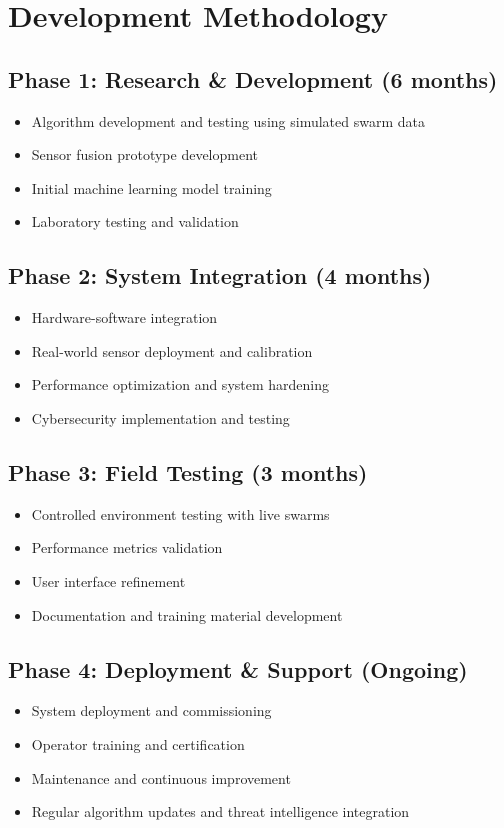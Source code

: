 \documentclass[11pt,a4paper]{article}
\begin{document}
\section{Development Methodology}

\subsection{Phase 1: Research \& Development (6 months)}
\begin{itemize}[leftmargin=2em]
    \item Algorithm development and testing using simulated swarm data
    \item Sensor fusion prototype development
    \item Initial machine learning model training
    \item Laboratory testing and validation
\end{itemize}

\subsection{Phase 2: System Integration (4 months)}
\begin{itemize}[leftmargin=2em]
    \item Hardware-software integration
    \item Real-world sensor deployment and calibration
    \item Performance optimization and system hardening
    \item Cybersecurity implementation and testing
\end{itemize}

\subsection{Phase 3: Field Testing (3 months)}
\begin{itemize}[leftmargin=2em]
    \item Controlled environment testing with live swarms
    \item Performance metrics validation
    \item User interface refinement
    \item Documentation and training material development
\end{itemize}

\subsection{Phase 4: Deployment \& Support (Ongoing)}
\begin{itemize}[leftmargin=2em]
    \item System deployment and commissioning
    \item Operator training and certification
    \item Maintenance and continuous improvement
    \item Regular algorithm updates and threat intelligence integration
\end{itemize}
\end{document}
